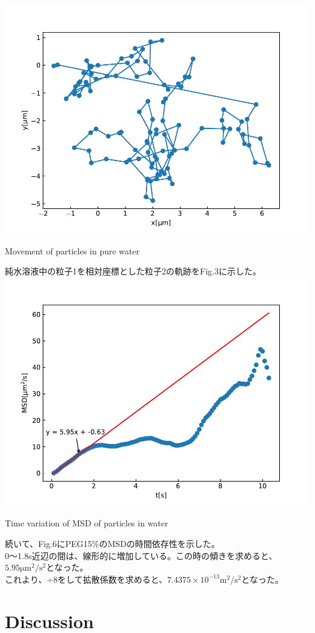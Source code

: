 \documentclass[a4paper,10pt]{jsarticle}
\makeatletter
\newenvironment{figurehere}
{\def\@captype{figure}}
{}
\makeatother
\begin{document}
\begin{figurehere}
\centering
\includegraphics[width=0.7\linewidth]{fig/water_move_plot.pdf}
\caption{Movement of particles in pure water}
\label{fig:move_plot}
\end{figurehere}

純水溶液中の粒子1を相対座標とした粒子2の軌跡をFig.3に示した。\\

\begin{figurehere}
  \centering
  \includegraphics[width=0.7\linewidth]{fig/water_D.pdf}
  \caption{Time variation of MSD of particles in water}
  \label{fig:move_plot}
  \end{figurehere}

  続いて、Fig.6にPEG15\%のMSDの時間依存性を示した。\\
  0〜1.8s近辺の間は、線形的に増加している。この時の傾きを求めると、$5.95 \text{μm}^2/\text{s}^2$となった。\\
  これより、÷8をして拡散係数を求めると、$7.4375×10^{-13} \text{m}^2/\text{s}^2$となった。\\

\section{\textrm{Discussion}}
\end{document}
